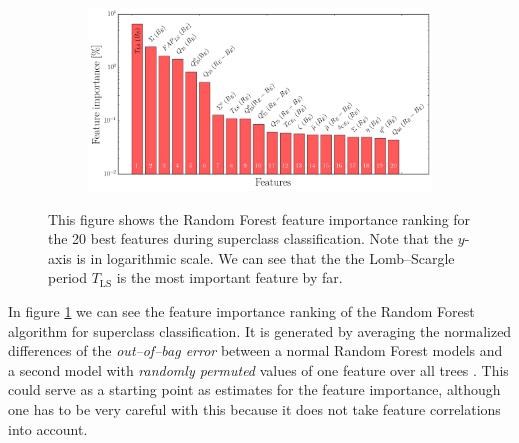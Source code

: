 \begin{figure}[H]
	\centering
	\begin{subfigure}[t]{\textwidth}
		\centering
		\includegraphics[width=\textwidth]{figures/feature-importance/rf-superclasses-feature-importance.png}
	\end{subfigure}
	\caption[Feature importance from the Random Forest classifier]{This figure shows the Random Forest feature importance ranking for the 20 best features during superclass classification. Note that the $y$-axis is in logarithmic scale. We can see that the the Lomb--Scargle period $T_\text{LS}$ is the most important feature by far.}
	\label{fig:rf-feature-importance}
\end{figure}

In figure \ref{fig:rf-feature-importance} we can see the feature importance ranking of the Random Forest algorithm for superclass classification. It is generated by averaging the normalized differences of the \emph{out--of--bag error} between a normal Random Forest models and a second model with \emph{randomly permuted} values of one feature over all trees \citep{dubath2011}. This could serve as a starting point as estimates for the feature importance, although one has to be very careful with this because it does not take feature correlations into account.\\

